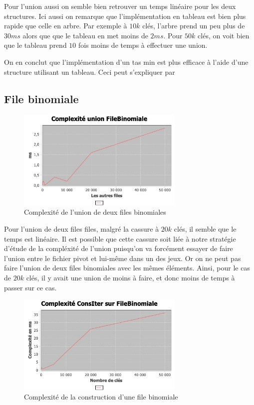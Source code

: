 \documentclass{article}
\begin{document}
Pour l’union aussi on semble bien retrouver un temps linéaire pour les deux structures. Ici aussi on remarque que l’implémentation en tableau est bien plus rapide que celle en arbre. Par exemple à $10k$ clés, l’arbre prend un peu plus de $30ms$ alors que que le tableau en met moins de $2ms$. Pour $50k$ clés, on voit bien que le tableau prend $10$ fois moins de temps à effectuer une union.

On en conclut que l’implémentation d’un tas min est plus efficace à l’aide d’une structure utilisant un tableau. Ceci peut s’expliquer par %

\subsection{File binomiale}


\begin{figure}[h!]
\centering
\includegraphics[width=8cm]{fileb_union.jpg}
\caption{Complexité de l'union de deux files binomiales}
\label{fig:fbunio}
\end{figure}



Pour l'union de deux files files, malgré la cassure à $20k$ clés, il semble que le temps est linéaire. Il est possible que cette cassure soit liée à notre stratégie d'étude de la compléxité de l'union puisqu'on va forcément essayer de faire l'union entre le fichier pivot et lui-même dans un des jeux. Or on ne peut pas faire l'union de deux files binomiales avec les mêmes éléments. Ainsi, pour le cas de $20k$ clés, il y avait une union de moins à faire, et donc moins de temps à passer sur ce cas.

\begin{figure}[h!]
\centering
\includegraphics[width=8cm]{FBcomplexConsIter.jpg}
\caption{Complexité de la construction d'une file binomiale}
\label{fig:fbconsi}
\end{figure}
\end{document}
